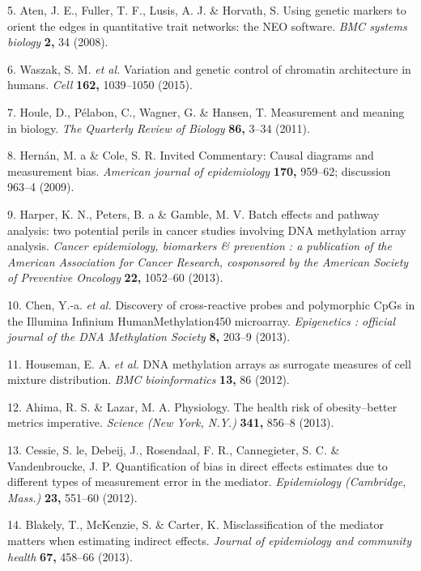 \documentclass[]{article}
\begin{document}
\hypertarget{ref-Aten2008}{}
5. Aten, J. E., Fuller, T. F., Lusis, A. J. \& Horvath, S. Using genetic
markers to orient the edges in quantitative trait networks: the NEO
software. \emph{BMC systems biology} \textbf{2,} 34 (2008).

\hypertarget{ref-Waszak2015}{}
6. Waszak, S. M. \emph{et al.} Variation and genetic control of
chromatin architecture in humans. \emph{Cell} \textbf{162,} 1039--1050
(2015).

\hypertarget{ref-Houle2011}{}
7. Houle, D., Pélabon, C., Wagner, G. \& Hansen, T. Measurement and
meaning in biology. \emph{The Quarterly Review of Biology} \textbf{86,}
3--34 (2011).

\hypertarget{ref-Hernan2009}{}
8. Hernán, M. a \& Cole, S. R. Invited Commentary: Causal diagrams and
measurement bias. \emph{American journal of epidemiology} \textbf{170,}
959--62; discussion 963--4 (2009).

\hypertarget{ref-Harper2013}{}
9. Harper, K. N., Peters, B. a \& Gamble, M. V. Batch effects and
pathway analysis: two potential perils in cancer studies involving DNA
methylation array analysis. \emph{Cancer epidemiology, biomarkers \&
prevention : a publication of the American Association for Cancer
Research, cosponsored by the American Society of Preventive Oncology}
\textbf{22,} 1052--60 (2013).

\hypertarget{ref-Chen2013a}{}
10. Chen, Y.-a. \emph{et al.} Discovery of cross-reactive probes and
polymorphic CpGs in the Illumina Infinium HumanMethylation450
microarray. \emph{Epigenetics : official journal of the DNA Methylation
Society} \textbf{8,} 203--9 (2013).

\hypertarget{ref-Houseman2012}{}
11. Houseman, E. A. \emph{et al.} DNA methylation arrays as surrogate
measures of cell mixture distribution. \emph{BMC bioinformatics}
\textbf{13,} 86 (2012).

\hypertarget{ref-Ahima2013}{}
12. Ahima, R. S. \& Lazar, M. A. Physiology. The health risk of
obesity--better metrics imperative. \emph{Science (New York, N.Y.)}
\textbf{341,} 856--8 (2013).

\hypertarget{ref-LeCessie2012}{}
13. Cessie, S. le, Debeij, J., Rosendaal, F. R., Cannegieter, S. C. \&
Vandenbroucke, J. P. Quantification of bias in direct effects estimates
due to different types of measurement error in the mediator.
\emph{Epidemiology (Cambridge, Mass.)} \textbf{23,} 551--60 (2012).

\hypertarget{ref-Blakely2013}{}
14. Blakely, T., McKenzie, S. \& Carter, K. Misclassification of the
mediator matters when estimating indirect effects. \emph{Journal of
epidemiology and community health} \textbf{67,} 458--66 (2013).
\end{document}

